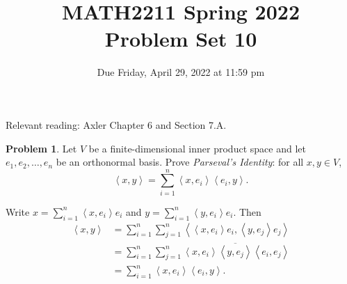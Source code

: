 \documentclass[11pt,oneside]{amsart}
\title{MATH2211 Spring 2022\\
Problem Set 10}
\author{Due Friday, April 29, 2022 at 11:59 pm}
\theoremstyle{definition}
\newtheorem{problem}{Problem}
\newcommand{\innerprod}[1]{\left\langle#1\right\rangle}
\begin{document}
    \maketitle

    Relevant reading: Axler Chapter 6 and Section 7.A.

    \begin{problem}
        Let $V$ be a finite-dimensional inner product space and let $e_1,e_2,\dots,e_n$ be an orthonormal basis. Prove \emph{Parseval's Identity}: for all $x,y\in V$,
        \[\innerprod{x,y} =\sum_{i=1}^n \innerprod{x,e_i}\innerprod{e_i,y}.\]
    \end{problem}
    \begin{solution}
        Write $x=\sum_{i=1}^n \innerprod{x,e_i} e_i$ and $y=\sum_{i=1}^n \innerprod{y,e_i} e_i$. Then
        \[\begin{split}
            \innerprod{x,y} &= \sum_{i=1}^n\sum_{j=1}^n\innerprod{\innerprod{x,e_i} e_i,\innerprod{y,e_j} e_j}\\
            &= \sum_{i=1}^n\sum_{j=1}^n\innerprod{x,e_i}\overline{\innerprod{y,e_j}}\innerprod{e_i,e_j}\\
            &= \sum_{i=1}^n\innerprod{x,e_i}\innerprod{e_i,y}.
        \end{split}\]
    \end{solution}
\end{document}

